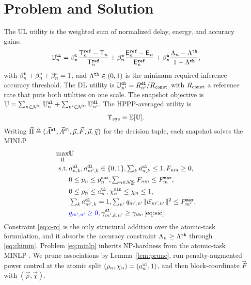 \documentclass[journal]{IEEEtran}
\begin{document}
\section{Problem and Solution}
\label{sec:sol}
{\color{blue}The UL utility is the weighted sum of normalized delay, energy, and accuracy gains:}
\begin{equation}
\mathbb{U}_n^{\tt ul}
=\beta_n^{\tt t}\frac{\mathsf{T}_n^{\tt ref}-\mathsf{T}_n}{\mathsf{T}_n^{\tt ref}}
+\beta_n^{\tt e}\frac{\mathsf{E}_n^{\tt ref}-\mathsf{E}_n}{\mathsf{E}_n^{\tt ref}}
+\beta_n^{\tt a}\frac{\Lambda_n-\Lambda^{\tt th}}{1-\Lambda^{\tt th}},
\label{eq:Uul}
\end{equation}
with $\beta_n^{\tt t}+\beta_n^{\tt e}+\beta_n^{\tt a}=1$, and {\color{blue}$\Lambda^{\tt th} \in (0, 1)$ is the minimum required inference accuracy threshold.}
The DL utility is $\mathbb{U}_{n'}^{\tt dl}=R_{n'}^{\tt dl}/R_{\tt const}$ with $R_{\tt const}$ a reference rate that puts both utilities on one scale. The snapshot objective is $\mathbb{U}=\sum_{n\in\mathcal{N}^{\tt ul}}\mathbb{U}_n^{\tt ul}+\sum_{n'\in\mathcal{N}^{\tt dl}}\mathbb{U}_{n'}^{\tt dl}$. The HPPP-averaged utility is
\begin{equation}
\Upsilon_{\tt sys}
=\mathbb{E}[\mathbb{U}].
\label{eq:upsilon}
\end{equation}
Writing $\vec{\Pi}\triangleq(\vec{A}^{\tt ul},\vec{A}^{\tt dl},\vec{p},\vec{F},\vec{\rho},\vec{\chi})$ for the decision tuple, each snapshot solves the MINLP
\begin{subequations}\label{eq:minlp}
\begin{align}
\max_{\vec{\Pi}}&\mathbb{U}\\
\mathrm{s.t.}\,&a_{n,k}^{\tt ul},a_{m',k}^{\tt dl}\in\{0,1\},\textstyle\sum_k a_{n,k}^{\tt ul}\le1,F_{nm}\ge0,\label{eq:c-a}\\
&0\le p_n\le p_n^{\tt max},\textstyle\sum_{n\in\mathcal{N}_m^{\tt ul}}F_{nm}\le F_m^{\tt max},\label{eq:c-pf}\\
&0\le\rho_n\le a_n^{\tt ul},\chi_n^{\tt min}\le\chi_n\le1,\label{eq:c-rc}\\
&\textstyle\sum_k a_{m',k}^{\tt dl}=1,\textstyle\sum_{n'}q_{m',n'}\Vert\vec{w}_{m',n'}\Vert^2\le P_{m'}^{\tt max},\label{eq:c-dl}\\
&{\color{blue}q_{m',n'} \ge 0}, \gamma_{m',k,n'}^{\tt dl}\ge\gamma_{\tt th},\eqref{eq:sic}. \label{eq:c-sic}
\end{align}
\end{subequations}
Constraint \eqref{eq:c-rc} is the only structural addition over the atomic-task formulation, and it absorbs the accuracy constraint $\Lambda_n\ge\Lambda^{\tt th}$ through \eqref{eq:chimin}. Problem \eqref{eq:minlp} inherits NP-hardness from the atomic-task MINLP \cite{Hoang_TCOM_2024}. We prune associations by Lemma~\ref{lem:prune}, run penalty-augmented power control at the atomic split $(\rho_n,\chi_n)=(a_n^{\tt ul},1)$, and then block-coordinate $\vec{F}$ with $(\vec{\rho},\vec{\chi})$.
\end{document}
